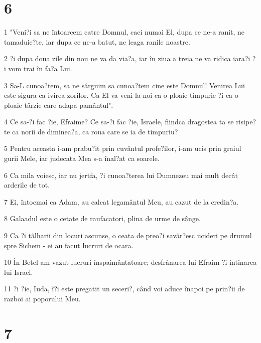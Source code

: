 \chapter{6}

\par 1 "Veni?i sa ne întoarcem catre Domnul, caci numai El, dupa ce ne-a ranit, ne tamaduie?te, iar dupa ce ne-a batut, ne leaga ranile noastre.
\par 2 ?i dupa doua zile din nou ne va da via?a, iar în ziua a treia ne va ridica iara?i ?i vom trai în fa?a Lui.
\par 3 Sa-L cunoa?tem, sa ne sârguim sa cunoa?tem cine este Domnul! Venirea Lui este sigura ca ivirea zorilor. Ca El va veni la noi ca o ploaie timpurie ?i ca o ploaie târzie care adapa pamântul".
\par 4 Ce sa-?i fac ?ie, Efraime? Ce sa-?i fac ?ie, Israele, fiindca dragostea ta se risipe?te ca norii de diminea?a, ca roua care se ia de timpuriu?
\par 5 Pentru aceasta i-am prabu?it prin cuvântul profe?ilor, i-am ucis prin graiul gurii Mele, iar judecata Mea s-a înal?at ca soarele.
\par 6 Ca mila voiesc, iar nu jertfa, ?i cunoa?terea lui Dumnezeu mai mult decât arderile de tot.
\par 7 Ei, întocmai ca Adam, au calcat legamântul Meu, au cazut de la credin?a.
\par 8 Galaadul este o cetate de raufacatori, plina de urme de sânge.
\par 9 Ca ?i tâlharii din locuri ascunse, o ceata de preo?i savâr?esc ucideri pe drumul spre Sichem - ei au facut lucruri de ocara.
\par 10 În Betel am vazut lucruri înspaimântatoare; desfrânarea lui Efraim ?i întinarea lui Israel.
\par 11 ?i ?ie, Iuda, î?i este pregatit un seceri?, când voi aduce înapoi pe prin?ii de razboi ai poporului Meu.

\chapter{7}

